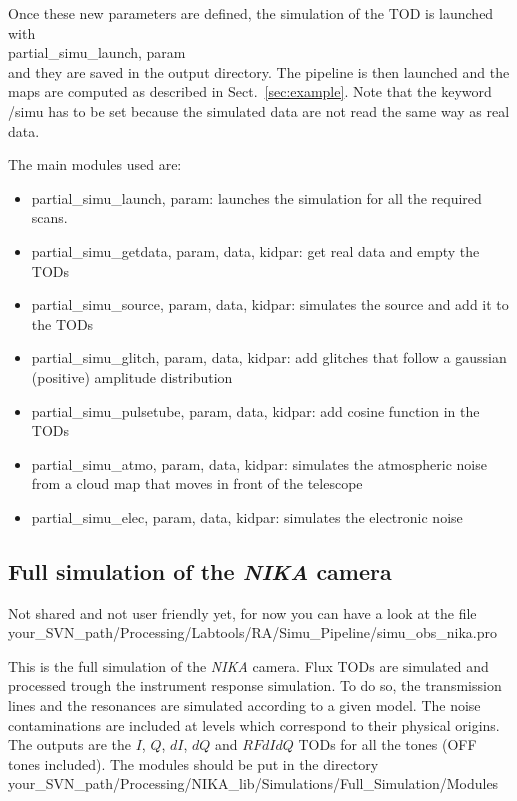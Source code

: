 \documentclass[a4paper]{article}
\begin{document}
Once these new parameters are defined, the simulation of the TOD is launched with \\
{\color{blue} partial\_simu\_launch, param} \\
and they are saved in the output directory. The pipeline is then launched and the maps are computed as described in Sect.~\ref{sec:example}. Note that the keyword {\color{blue} /simu} has to be set because the simulated data are not read the same way as real data.

The main modules used are:
\begin{itemize}
\item {\color{blue} partial\_simu\_launch, param}: launches the simulation for all the required scans.
\item {\color{blue} partial\_simu\_getdata, param, data, kidpar}: get real data and empty the TODs
\item {\color{blue} partial\_simu\_source, param, data, kidpar}: simulates the source and add it to the TODs
\item {\color{blue} partial\_simu\_glitch, param, data, kidpar}: add glitches that follow a gaussian (positive) amplitude distribution
\item {\color{blue} partial\_simu\_pulsetube, param, data, kidpar}: add cosine function in the TODs
\item {\color{blue} partial\_simu\_atmo, param, data, kidpar}: simulates the atmospheric noise from a cloud map that moves in front of the telescope
\item {\color{blue} partial\_simu\_elec, param, data, kidpar}: simulates the electronic noise
\end{itemize}

\subsection{Full simulation of the {\it NIKA} camera}
{\color{red} Not shared and not user friendly yet, for now you can have a look at the file \\
your\_SVN\_path/Processing/Labtools/RA/Simu\_Pipeline/simu\_obs\_nika.pro}

This is the full simulation of the {\it NIKA} camera. Flux TODs are simulated and processed trough the instrument response simulation. To do so, the transmission lines and the resonances are simulated according to a given model. The noise contaminations are included at levels which correspond to their physical origins. The outputs are the $I$, $Q$, $dI$, $dQ$ and $RFdIdQ$ TODs for all the tones (OFF tones included). The modules should be put in the directory \\
{\color{blue} your\_SVN\_path/Processing/NIKA\_lib/Simulations/Full\_Simulation/Modules}
\end{document}
